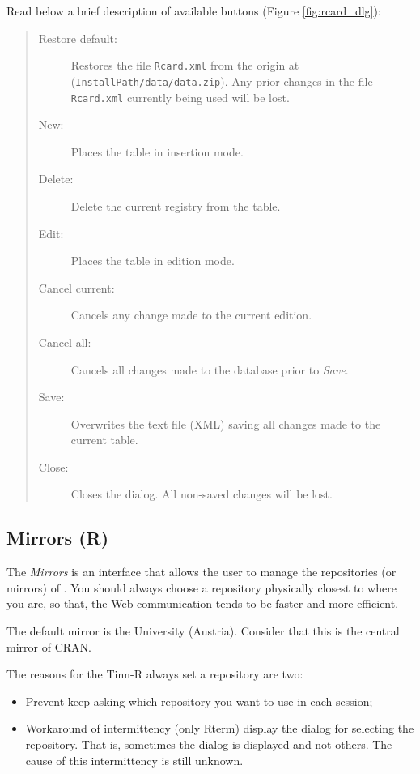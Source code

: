 Read below a brief description of available buttons (Figure \ref{fig:rcard_dlg}):

\begin{quote}
  \begin{footnotesize}
    \begin{description}
      \item[Restore default:]
        Restores the file \texttt{Rcard.xml} from the origin at
        (\texttt{InstallPath/data/data.zip}). Any prior changes in the
        file \texttt{Rcard.xml} currently being used will be lost.
      \item[New:]
        Places the table in insertion mode.
      \item[Delete:]
        Delete the current registry from the table.
      \item[Edit:]
        Places the table in edition mode.
      \item[Cancel current:]
        Cancels any change made to the current edition.
      \item[Cancel all:]
        Cancels all changes made to the database prior to \textit{Save}.
      \item[Save:]
        Overwrites the text file (XML) saving all changes made to the current table.
      \item[Close:]
        Closes the dialog. All non-saved changes will be lost.
    \end{description}
  \end{footnotesize}
\end{quote}


\subsection{Mirrors (R)}

The \textit{Mirrors} is an interface that allows the user to manage the repositories (or mirrors) of \RR{}.
You should always choose a repository physically closest to where you are,
so that, the Web communication tends to be faster and more efficient.

The default mirror is the University 
(Austria). Consider that this is the central mirror of CRAN.

The reasons for the Tinn-R always set a repository are two:
\begin {itemize}
   \item Prevent \RR{} keep asking which repository you want to use in each session;
   \item Workaround of intermittency (only Rterm) display the dialog for selecting the repository.
    That is, sometimes the dialog is displayed and not others. The cause of this intermittency is still unknown.
\end {itemize}

